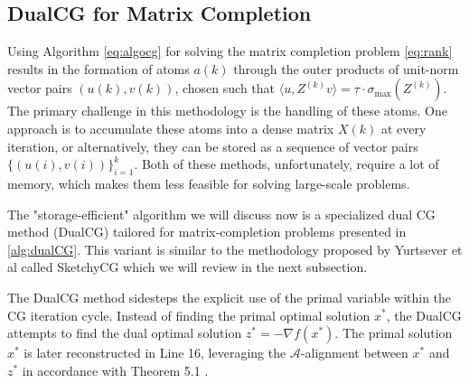 \documentclass[10pt, twocolumn, reqno, a4paper,oneside]{amsart}
\numberwithin{equation}{section}
\numberwithin{theorem}{section}
\numberwithin{figure}{section}
\numberwithin{table}{section}
\numberwithin{theorem}{section}
\numberwithin{equation}{section}
\begin{document}
\subsection{DualCG for Matrix Completion}

Using Algorithm \ref{eq:algocg} for solving the matrix completion problem \ref{eq:rank} results in the formation of atoms \( a(k) \) through the outer products of unit-norm vector pairs $(u(k), v(k))$, chosen such that \( \langle u, Z^{(k)}v \rangle = \tau \cdot \sigma_{\max}(Z^{(k)}) \). The primary challenge in this methodology is the handling of these atoms. One approach is to accumulate these atoms into a dense matrix \( X(k) \) at every iteration, or alternatively, they can be stored as a sequence of vector pairs \( \{(u(i), v(i))\}_{i=1}^{k} \). Both of these methods, unfortunately, require a lot of memory, which makes them less feasible for solving large-scale problems.

The "storage-efficient" algorithm we will discuss now is a specialized dual CG method (DualCG) tailored for matrix-completion problems presented in \ref{alg:dualCG}.
This variant is similar to the methodology proposed by Yurtsever et al \cite{pmlr-v54-yurtsever17a} called SketchyCG which we will review in the next subsection.

The DualCG method sidesteps the explicit use of the primal variable within the CG iteration cycle.
Instead of finding the primal optimal solution $x^*$, the DualCG attempts to find the dual optimal solution \(z^* = -\nabla f(x^*)\). The primal solution \(x^*\) is later reconstructed in Line 16, leveraging the $\mathcal{A}$-alignment between \(x^*\) and \(z^*\) in accordance with Theorem 5.1 \cite{2019PolarAlignment}.

\end{document}
